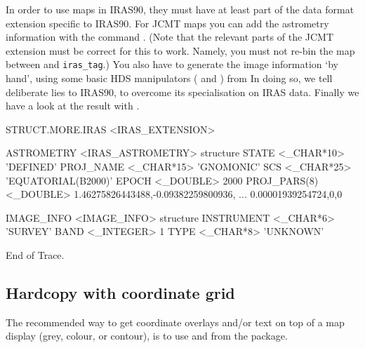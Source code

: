 \documentclass[11pt,noabs]{starlink}
\begin{document}
   In order to use maps in IRAS90, they must have at least part
   of the data format extension specific to IRAS90. For JCMT maps you
   can add the astrometry information with the command
\texttt{}.
   (Note that the relevant parts of the JCMT extension must be correct
   for this to work. Namely, you must not re-bin the map between
\texttt{}
   and \texttt{iras\_tag}.) You also have to generate the image information
   `by hand', using some basic HDS manipulators
(\texttt{}
   and
\texttt{})
   from
   In doing so, we tell deliberate lies to IRAS90, to overcome its
   specialisation on IRAS data. Finally we have a look at the result with
\texttt{}.

\begin{terminalv}

STRUCT.MORE.IRAS  <IRAS_EXTENSION>

  ASTROMETRY     <IRAS_ASTROMETRY>   {structure}
     STATE          <_CHAR*10>      'DEFINED'
     PROJ_NAME      <_CHAR*15>      'GNOMONIC'
     SCS            <_CHAR*25>      'EQUATORIAL(B2000)'
     EPOCH          <_DOUBLE>       2000
     PROJ_PARS(8)   <_DOUBLE>       1.46275826443488,-0.09382259800936,
                                    ... 0.00001939254724,0,0

  IMAGE_INFO     <IMAGE_INFO>    {structure}
     INSTRUMENT     <_CHAR*6>       'SURVEY'
     BAND           <_INTEGER>      1
     TYPE           <_CHAR*8>       'UNKNOWN'

End of Trace.
\end{terminalv}


\subsection{\label{grid}Hardcopy with coordinate grid}

   The recommended way to get coordinate overlays and/or text on top of
   a map display (grey, colour, or contour), is to use
\texttt{}
   and
\texttt{}
   from the
   package.
\end{document}
